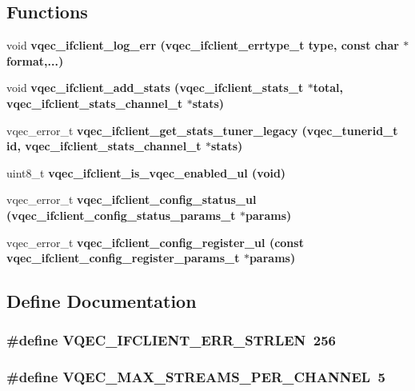 \subsection*{Functions}
\begin{CompactItemize}
\item 
void \bf{vqec\_\-ifclient\_\-log\_\-err} (\bf{vqec\_\-ifclient\_\-errtype\_\-t} type, const char $\ast$format,...)
\item 
void \bf{vqec\_\-ifclient\_\-add\_\-stats} (\bf{vqec\_\-ifclient\_\-stats\_\-t} $\ast$total, \bf{vqec\_\-ifclient\_\-stats\_\-channel\_\-t} $\ast$stats)
\item 
vqec\_\-error\_\-t \bf{vqec\_\-ifclient\_\-get\_\-stats\_\-tuner\_\-legacy} (vqec\_\-tunerid\_\-t id, \bf{vqec\_\-ifclient\_\-stats\_\-channel\_\-t} $\ast$stats)
\item 
uint8\_\-t \bf{vqec\_\-ifclient\_\-is\_\-vqec\_\-enabled\_\-ul} (void)
\item 
vqec\_\-error\_\-t \bf{vqec\_\-ifclient\_\-config\_\-status\_\-ul} (\bf{vqec\_\-ifclient\_\-config\_\-status\_\-params\_\-t} $\ast$params)
\item 
vqec\_\-error\_\-t \bf{vqec\_\-ifclient\_\-config\_\-register\_\-ul} (const \bf{vqec\_\-ifclient\_\-config\_\-register\_\-params\_\-t} $\ast$params)
\end{CompactItemize}


\subsection{Define Documentation}
\subsubsection{\setlength{\rightskip}{0pt plus 5cm}\#define VQEC\_\-IFCLIENT\_\-ERR\_\-STRLEN~256}\label{vqec__ifclient__private_8h_2dd732612ed6241150613e87fe1d0b21}


\subsubsection{\setlength{\rightskip}{0pt plus 5cm}\#define VQEC\_\-MAX\_\-STREAMS\_\-PER\_\-CHANNEL~5}\label{vqec__ifclient__private_8h_dbf36bafdc7e9dd0ff37418a07ba5452}




